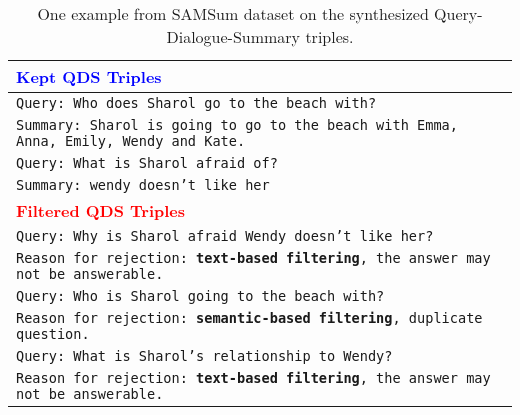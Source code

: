 \documentclass[11pt]{article}
\begin{document}
\begin{table*}[t]
\begin{adjustbox}{width=1.00\textwidth,center}
\begin{tabular}{ | l |}
        \hline \hline
        \textbf{\textcolor{blue}{Kept QDS Triples}}\\ 
        \hline
        \texttt{Query: Who does Sharol go to the beach with? } \\
        \texttt{Summary: Sharol is going to go to the beach with Emma, Anna, Emily, Wendy and Kate.}\\ \hline
        \texttt{Query: What is Sharol afraid of?}\\
        \texttt{Summary: wendy doesn't like her }\\
        
        \hline \hline
        \textbf{\textcolor{red}{Filtered QDS Triples}} \\ 
        \hline
        \texttt{Query: Why is Sharol afraid Wendy doesn't like her?} \\
        \texttt{Reason for rejection: \textbf{text-based filtering}, the answer may not be answerable.} \\ \hline
        \texttt{Query: Who is Sharol going to the beach with?} \\
        \texttt{Reason for rejection: \textbf{semantic-based filtering}, duplicate question.} \\ \hline
        \texttt{Query: What is Sharol's relationship to Wendy?} \\
        \texttt{Reason for rejection: \textbf{text-based filtering}, the answer may not be answerable.} \\         
        \bottomrule
        \end{tabular}
        \end{adjustbox}
        \caption{One example from SAMSum dataset on the synthesized Query-Dialogue-Summary triples.}
        \label{tab:QDS_examples_SAMSUM}
    \end{table*}

    
\end{document}

